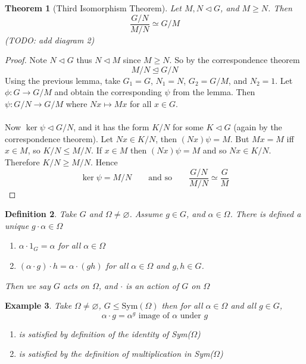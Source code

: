 \documentclass[a4paper,10pt]{article}
\newtheorem{thm}{Theorem}
\newtheorem{Def}[thm]{Definition}
\newtheorem{eg}[thm]{Example}
\begin{document}
\begin{thm}[Third Isomorphism Theorem]
Let $M, N \triangleleft G$, and $M \geq N$. Then 
\[ \frac{G/N}{M / N} \simeq G / M \]
(TODO: add diagram 2)
\end{thm}


\begin{proof}
Note $N \triangleleft G$ thus $N \triangleleft M$ since $M \geq N$. So by the correspondence theorem
\[ M / N \trianglelefteq G / N \]
Using the previous lemma, take $G_1 = G$, $N_1 = N$, $G_2 = G / M$, and $N_2 = 1$. Let $\phi : G \rightarrow G / M$ and obtain the corresponding $\psi$ from the lemma. Then $\psi : G / N \rightarrow G / M$ where $Nx \mapsto Mx$ for all $x \in G$. \\
\\
Now $\ker \psi \triangleleft G / N$, and it has the form $K / N$ for some $K \triangleleft G$ (again by the correspondence theorem). Let $Nx \in K / N$, then $(Nx) \psi = M$. But $Mx = M$ iff $x \in M$, so $K / N \leq M / N$.  If $x \in M$ then $(Nx) \psi = M$ and so $Nx \in K / N$. Therefore $K / N \geq M / N$. Hence
\[ \ker \psi  = M/ N \qquad \text{and so} \qquad \frac{G / N}{M / N} \simeq \frac{G}{M} \]

\end{proof}

\begin{Def}
Take $G$ and $\Omega \neq \varnothing$. Assume $g \in G$, and $\alpha \in \Omega$. There is defined a unique $g \cdot \alpha \in \Omega$
\begin{enumerate}
\item $\alpha \cdot 1_G = \alpha$ for all $\alpha \in \Omega$ 
\item $(\alpha \cdot g) \cdot h = \alpha \cdot (gh)$ for all $\alpha \in \Omega$ and $g,h \in G$.   
\end{enumerate}
Then we say $G$ acts on $\Omega$, and $\cdot$ is an action of $G$ on $\Omega$
\end{Def}

\begin{eg}
Take $\Omega \neq \varnothing$, $G \leq \text{Sym}(\Omega)$ then for all $\alpha \in \Omega$ and all $g \in G$, 
\[ \alpha \cdot g  = \alpha ^ g \text{ image of $\alpha$ under $g$} \]
\begin{enumerate}
\item is satisfied by definition of the identity of Sym($\Omega$)
\item is satisfied by the definition of multiplication in Sym($\Omega$)
\end{enumerate}
\end{eg}
\end{document}
